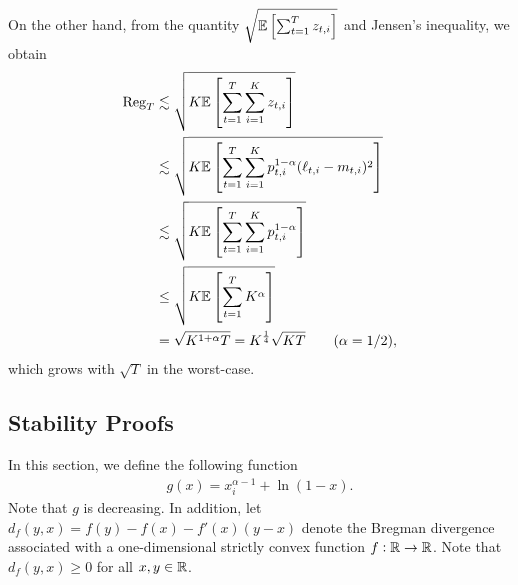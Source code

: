 On the other hand, from the quantity $\sqrt{\mathbb{E}\left[\sum_{t=1}^T z_{t,i}\right]}$ and Jensen's inequality, we obtain 
\begin{align*}
    \mathrm{Reg}_T &\lesssim \sqrt{K\mathbb{E}\left[\sum_{t=1}^T \sum_{i=1}^K z_{t,i}\right]} \\
    &\lesssim \sqrt{K\mathbb{E}\left[\sum_{t=1}^T \sum_{i=1}^K p_{t,i}^{1-\alpha}(\ell_{t,i} - m_{t,i})^2\right]} \\
    &\lesssim \sqrt{K\mathbb{E}\left[\sum_{t=1}^T \sum_{i=1}^K p_{t,i}^{1-\alpha}\right]} \\
    &\leq \sqrt{K\mathbb{E}\left[\sum_{t=1}^T K^\alpha\right]} \\
    &= \sqrt{K^{1+\alpha}T} = K^{\frac{1}{4}}\sqrt{KT} \qquad (\alpha = 1/2),
\end{align*}
which grows with $\sqrt{T}$ in the worst-case.

\subsection{Stability Proofs}
\label{sec:CoordinateWiseSPMStabilityProofs}
In this section, we define the following function
\begin{align}
    g(x) = x_i^{\alpha-1} + \ln(1-x).
\end{align}
Note that $g$ is decreasing.
%
In addition, let $d_f(y, x) = f(y) - f(x) - f'(x)(y-x)$ denote the Bregman divergence associated with a one-dimensional strictly convex function $f: \mathbb{R} \to \mathbb{R}$. Note that $d_f(y,x) \geq 0$ for all $x, y \in \mathbb{R}$.

